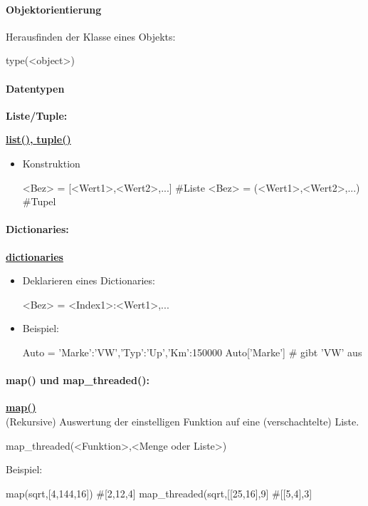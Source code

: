 \documentclass[a4paper,9pt,DIV15,twocolumn]{scrartcl}
\begin{document}
\paragraph{Objektorientierung}
Herausfinden der Klasse eines Objekts:
\begin{sageinsmall}
type(<object>)
\end{sageinsmall}
\paragraph{Datentypen}
\textbf{Liste/Tuple:} 	{\href{http://docs.python.org/library/functions.html#list}{\textbf{list(),} } \href{http://docs.python.org/library/functions.html#tuple}{\textbf{tuple()}}
\begin{itemize}
 \item Konstruktion
\begin{sageinsmall}
<Bez> = [<Wert1>,<Wert2>,...] #Liste
<Bez> = (<Wert1>,<Wert2>,...) #Tupel
\end{sageinsmall}
\end{itemize}
\paragraph{Dictionaries:}		\href{http://docs.python.org/library/stdtypes.html?highlight=.update#mapping-types-dict}{\textbf{dictionaries}}
\begin{itemize}
 \item Deklarieren eines Dictionaries:
\begin{sageinsmall}
<Bez> = {<Index1>:<Wert1>,...}
\end{sageinsmall}
 \item Beispiel:
\begin{sageinsmall}
Auto = {'Marke':'VW','Typ':'Up','Km':150000}
Auto['Marke']		# gibt 'VW' aus
\end{sageinsmall}
\end{itemize}

\paragraph{map() und map\_threaded():} \href{https://sage.math.uni-goettingen.de/doc/static/reference/sage/combinat/generator.html?highlight=map#sage.combinat.generator.map}{\textbf{map()}}\\
(Rekursive) Auswertung der einstelligen Funktion auf eine (verschachtelte) Liste.
\begin{sageinsmall}
 map_threaded(<Funktion>,<Menge oder Liste>)
\end{sageinsmall}
Beispiel:
\begin{sageinsmall}
 map(sqrt,[4,144,16]) 			#[2,12,4]
 map_threaded(sqrt,[[25,16],9]	#[[5,4],3]
\end{sageinsmall}

}
\end{document}
